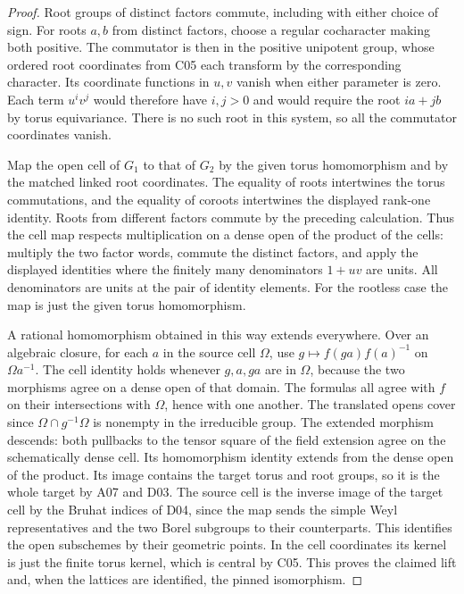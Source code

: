 \documentclass[11pt,a4paper,openany,oneside]{book}
\theoremstyle{resultstyle}
\theoremstyle{definition}
\numberwithin{equation}{chapter}
\begin{document}
\begin{proof}
Root groups of distinct factors commute, including with
either choice of sign. For roots \(a,b\) from distinct factors,
choose a regular cocharacter making both positive. The
commutator is then in the positive unipotent group, whose
ordered root coordinates from C05 each transform by the
corresponding character. Its coordinate functions in \(u,v\)
vanish when either parameter is zero. Each term \(u^iv^j\)
would therefore have \(i,j>0\) and would require the root
\(ia+jb\) by torus equivariance. There is no such root in this
system, so all the commutator coordinates vanish.

Map the open cell of \(G_1\) to that of \(G_2\) by the
given torus homomorphism and by the matched linked root
coordinates. The equality of roots intertwines the
torus commutations, and the equality of coroots intertwines
the displayed rank-one identity. Roots from different
factors commute by the preceding calculation. Thus the cell
map respects multiplication on a dense open of the product
of the cells: multiply the two factor words, commute the
distinct factors, and apply the displayed identities where the
finitely many denominators \(1+uv\) are units. All denominators
are units at the pair of identity elements. For the rootless
case the map is just the given torus homomorphism.

A rational homomorphism obtained in this way extends
everywhere. Over an algebraic closure, for each \(a\) in
the source cell \(\Omega\), use \(g\mapsto f(ga)f(a)^{-1}\)
on \(\Omega a^{-1}\). The cell identity holds whenever
\(g,a,ga\) are in \(\Omega\), because the two morphisms
agree on a dense open of that domain. The formulas all agree
with \(f\) on their intersections with \(\Omega\), hence with
one another. The translated opens cover since
\(\Omega\cap g^{-1}\Omega\) is nonempty in the irreducible group.
The extended morphism descends: both pullbacks to the tensor
square of the field extension agree on the schematically dense
cell. Its homomorphism identity extends from the dense open
of the product. Its image contains the target torus and root
groups, so it is the whole target by A07 and D03. The source
cell is the inverse image of the target cell by the Bruhat
indices of D04, since the map sends the simple Weyl representatives
and the two Borel subgroups to their counterparts. This identifies
the open subschemes by their geometric points. In the cell
coordinates its kernel is just the finite torus kernel, which
is central by C05. This proves the claimed lift and, when the
lattices are identified, the pinned isomorphism.


\end{proof}
\end{document}
